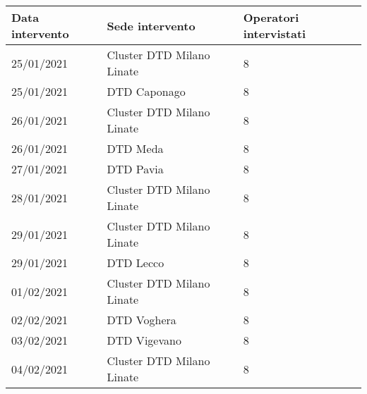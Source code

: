 \begin{tabular}{lll}
\toprule
Data intervento &            Sede intervento &  Operatori intervistati \\
\midrule
     25/01/2021 &  Cluster DTD Milano Linate &                       8 \\
     25/01/2021 &               DTD Caponago &                       8 \\
     26/01/2021 &  Cluster DTD Milano Linate &                       8 \\
     26/01/2021 &                   DTD Meda &                       8 \\
     27/01/2021 &                  DTD Pavia &                       8 \\
     28/01/2021 &  Cluster DTD Milano Linate &                       8 \\
     29/01/2021 &  Cluster DTD Milano Linate &                       8 \\
     29/01/2021 &                  DTD Lecco &                       8 \\
     01/02/2021 &  Cluster DTD Milano Linate &                       8 \\
     02/02/2021 &                DTD Voghera &                       8 \\
     03/02/2021 &               DTD Vigevano &                       8 \\
     04/02/2021 &  Cluster DTD Milano Linate &                       8 \\
\bottomrule
\end{tabular}
